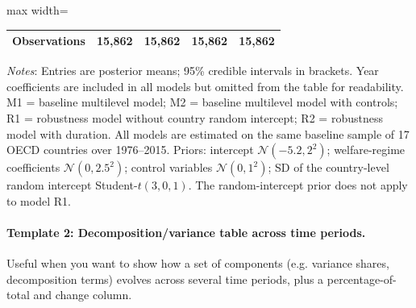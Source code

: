 \begin{table}[htbp]
\begin{adjustbox}{max width=\textwidth}
\begin{tabular}{lcccc}
Observations
  & 15{,}862 & 15{,}862 & 15{,}862 & 15{,}862 \\
\bottomrule
\end{tabular}
\end{adjustbox}

\vspace{0.3em}
\begin{minipage}{0.95\textwidth}
\footnotesize
\textit{Notes}: Entries are posterior means; 95\% credible intervals in brackets. Year coefficients are included in all models but omitted from the table for readability. M1 = baseline multilevel model; M2 = baseline multilevel model with controls; R1 = robustness model without country random intercept; R2 = robustness model with duration. All models are estimated on the same baseline sample of 17 OECD countries over 1976--2015. Priors: intercept \(\mathcal{N}(-5.2, 2^2)\); welfare-regime coefficients \(\mathcal{N}(0, 2.5^2)\); control variables \(\mathcal{N}(0, 1^2)\); SD of the country-level random intercept Student-\(t(3, 0, 1)\). The random-intercept prior does not apply to model R1.
\end{minipage}
\end{table}

\paragraph{Template 2: Decomposition/variance table across time periods.}
Useful when you want to show how a set of components (e.g. variance shares, decomposition terms) evolves across several time periods, plus a percentage-of-total and change column.

